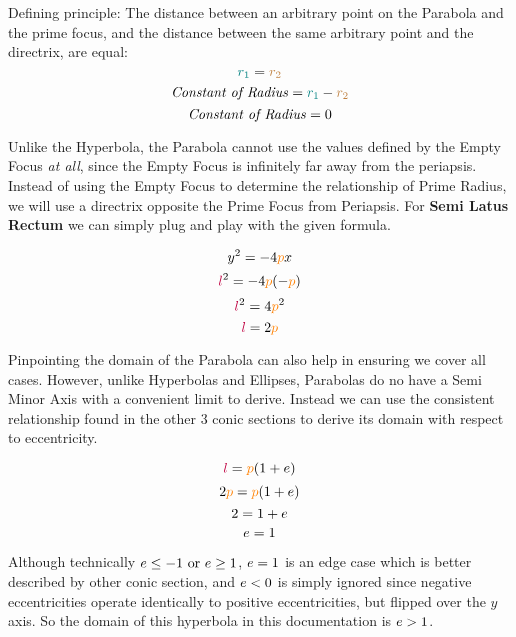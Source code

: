 Defining principle: The distance between an arbitrary point on the Parabola and the prime focus, and the distance between the same arbitrary point and the directrix, are equal:
$$\textcolor{teal}{r_1} = \textcolor{brown}{r_2}$$
$$\text{\textit{Constant of Radius}} = \textcolor{teal}{r_1} - \textcolor{brown}{r_2}$$
$$\text{\textit{Constant of Radius}} = 0$$

Unlike the Hyperbola, the Parabola cannot use the values defined by the Empty Focus \textit{at all}, since the Empty Focus is infinitely far away from the periapsis. Instead of using the Empty Focus to determine the relationship of Prime Radius, we will use a directrix opposite the Prime Focus from Periapsis. For \textbf{Semi Latus Rectum} we can simply plug and play with the given formula.

\bigskip
\begin{minipage}{\textwidth}
$$y^2=-4\textcolor{orange}{p}x$$
$$\textcolor{purple}{l}^2 = -4\textcolor{orange}{p}(-\textcolor{orange}{p})$$
$$\textcolor{purple}{l}^2 = 4\textcolor{orange}{p}^2$$
$$\textcolor{purple}{l} = 2\textcolor{orange}{p}$$
\end{minipage}
\bigskip

Pinpointing the domain of the Parabola can also help in ensuring we cover all cases. However, unlike Hyperbolas and Ellipses, Parabolas do no have a Semi Minor Axis with a convenient limit to derive. Instead we can use the consistent relationship found in the other 3 conic sections to derive its domain with respect to eccentricity.

$$\textcolor{purple}{l} = \textcolor{orange}{p}(1 + \textcolor{black}{e})$$
$$2\textcolor{orange}{p} = \textcolor{orange}{p}(1 + \textcolor{black}{e})$$
$$2 = 1 + \textcolor{black}{e}$$
$$\textcolor{black}{e} = 1$$

Although technically $\textcolor{black}{e}\leq-1\text{ or } \textcolor{black}{e} \geq 1$, $\textcolor{black}{e} = 1$ is an edge case which is better described by other conic section, and $\textcolor{black}{e} < 0$ is simply ignored since negative eccentricities operate identically to positive eccentricities, but flipped over the $y$ axis. So the domain of this hyperbola in this documentation is $\textcolor{black}{e} > 1$.